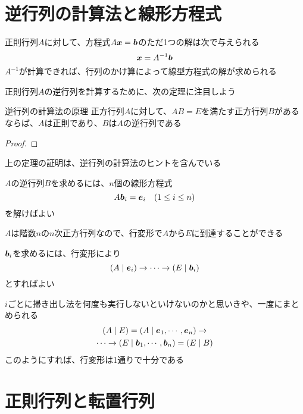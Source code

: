 \documentclass[../../../topic_linear-algebra]{subfiles}
\begin{document}
\sectionline
\section{逆行列の計算法と線形方程式}

正則行列$A$に対して、方程式$A\vb*{x} = \vb*{b}$のただ1つの解は次で与えられる
\begin{equation*}
  \vb*{x} = A^{-1} \vb*{b}
\end{equation*}
$A^{-1}$が計算できれば、行列のかけ算によって線型方程式の解が求められる

\sectionline

正則行列$A$の逆行列を計算するために、次の定理に注目しよう

\begin{theorem}{逆行列の計算法の原理}
  正方行列$A$に対して、$AB=E$を満たす正方行列$B$があるならば、$A$は正則であり、$B$は$A$の逆行列である
\end{theorem}

\begin{proof}
\end{proof}

上の定理の証明は、逆行列の計算法のヒントを含んでいる

$A$の逆行列$B$を求めるには、$n$個の線形方程式
\begin{equation*}
  A\vb*{b}_i = \vb*{e}_i \quad ( 1    \leq i \leq n )
\end{equation*}
を解けばよい

\br

$A$は階数$n$の$n$次正方行列なので、行変形で$A$から$E$に到達することができる

\br

$\vb*{b}_i$を求めるには、行変形により
\begin{equation*}
  (A \mid \vb*{e}_i) \rightarrow \cdots \rightarrow (E \mid \vb*{b}_i)
\end{equation*}
とすればよい

\br

$i$ごとに掃き出し法を何度も実行しないといけないのかと思いきや、一度にまとめられる
\begin{gather*}
  (A \mid E) = (A \mid \vb*{e}_1, \cdots , \vb*{e}_n) \rightarrow \\ \cdots \rightarrow (E \mid \vb*{b}_1 , \cdots , \vb*{b}_n) = (E \mid B)
\end{gather*}
このようにすれば、行変形は1通りで十分である

\sectionline
\section{正則行列と転置行列}
\end{document}
